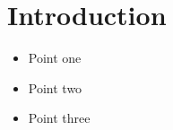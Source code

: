 \vspace{-0.8cm}
\section{Introduction}

\begin{itemize}%
	\item Point one
	\item Point two
	\item Point three
\end{itemize}